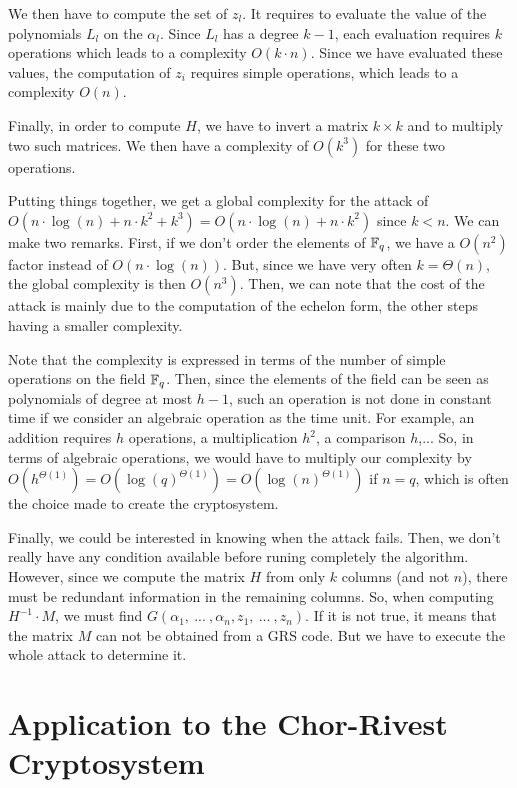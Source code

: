 \documentclass[a4paper]{article}
\begin{document}
We then have to compute the set of $z_l$. It requires to evaluate the value of the polynomials $L_l$ on the $\alpha_l$. Since $L_l$ has a degree $k-1$, each evaluation requires $k$ operations which
leads to a complexity $O(k \cdot n)$. Since we have evaluated these values, the computation of $z_i$ requires simple operations, which leads to a complexity $O(n)$.

Finally, in order to compute $H$, we have to invert a matrix $k\times k$ and to multiply two such matrices. We then have a complexity of $O(k^{3})$ for these two operations.

Putting things together, we get a global complexity for the attack of $O(n \cdot \log(n) + n \cdot k^{2} + k^{3}) = O(n \cdot \log(n) + n \cdot k^{2})$ since $k<n$. We can make two remarks. First, if we don't
order the elements of $\mathbb{F}_q$, we have a $O(n^{2})$ factor instead of $O(n \cdot \log(n))$. But, since we have very often $k=\varTheta(n)$, the global complexity is then $O(n^{3})$. Then, we can note that
the cost of the attack is mainly due to the computation of the echelon form, the other steps having a smaller complexity.

Note that the complexity is expressed in terms of the number of simple operations on the field $\mathbb{F}_q$. Then, since the elements of the field can be seen as polynomials of degree at most
$h-1$, such an operation is not done in constant time if we consider an algebraic operation as the time unit. For example, an addition requires $h$ operations, a multiplication $h^{2}$, a comparison
$h$,... So, in terms of algebraic operations, we would have to multiply our complexity by $O(h^{\varTheta(1)}) = O(\log(q)^{\varTheta(1)}) = O(\log(n)^{\varTheta(1)})$ if $n=q$, which is often the choice made to
create the cryptosystem.

Finally, we could be interested in knowing when the attack fails. Then, we don't really have any condition available before runing completely the algorithm.
However, since we compute the matrix $H$ from only $k$ columns (and not $n$), there must be redundant information in the remaining columns. So, when computing $H^{-1} \cdot M$, we must find $G(\alpha_1, \ ... \ , \alpha_n, z_1, \ ... \ , z_n)$.
If it is not true, it means that the matrix $M$ can not be obtained from a GRS code. But we have to execute the whole attack to determine it.



\section{Application to the Chor-Rivest Cryptosystem}
\label{sec:CRcrypt}
\end{document}

